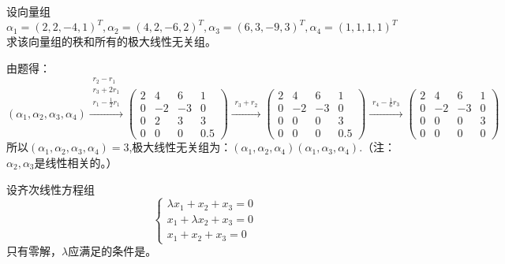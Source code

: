 \documentclass[a4paper]{report}
\begin{document}
\EX 设向量组
$
\alpha_1=(2,2,-4,1)^T,\alpha_2=(4,2,-6,2)^T,\alpha_3=(6,3,-9,3)^T,\alpha_4=(1,1,1,1)^T
$求该向量组的秩和所有的极大线性无关组。

\begin{jie}
由题得：
\begin{equation*}
(\alpha_1,\alpha_2,\alpha_3,\alpha_4)
\xrightarrow{\substack{r_{2}-r_{1}\\ r_3+2r_1\\ r_1-\frac{1}{2}r_1}}
{
\begin{pmatrix}
2&4&6&1\\
0&-2&-3&0\\
0&2&3&3\\
0&0&0&0.5
\end{pmatrix}
}\xrightarrow{\substack{r_3+r_2}}
{
\begin{pmatrix}
2&4&6&1\\
0&-2&-3&0\\
0&0&0&3\\
0&0&0&0.5
\end{pmatrix}
}\xrightarrow{\substack{r_4-\frac{1}{6}r_3}}
{
\begin{pmatrix}
2&4&6&1\\
0&-2&-3&0\\
0&0&0&3\\
0&0&0&0
\end{pmatrix}
}
\end{equation*}
所以$(\alpha_1,\alpha_2,\alpha_3,\alpha_4)=3$,极大线性无关组为：$(\alpha_1,\alpha_2,\alpha_4)(\alpha_1,\alpha_3,\alpha_4)$.（注：$\alpha_2,\alpha_3$是线性相关的。）
\end{jie}

\EX 设齐次线性方程组
\begin{equation*}
\begin{cases}
\lambda x_1+x_2+x_3=0\\
x_1+\lambda x_2+x_3=0\\
x_1+x_2+x_3=0
\end{cases}
\end{equation*}
只有零解，$\lambda$应满足的条件是\underline{\hphantom{~~~~~~~~~~~~~~}}。
\end{document}
